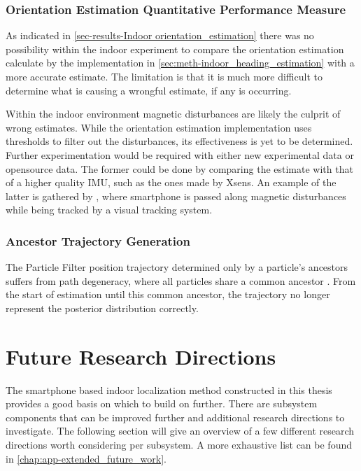 \subsubsection{ Orientation Estimation Quantitative Performance Measure}

As indicated in \cref{sec-results-Indoor orientation_estimation} there was no possibility within the indoor experiment to compare the orientation estimation calculate by the implementation in \cref{sec:meth-indoor_heading_estimation} with a more accurate estimate. The limitation is that it is much more difficult to determine what is causing a wrongful estimate, if any is occurring. \par  

Within the indoor environment magnetic disturbances are likely the culprit of wrong estimates. While the orientation estimation implementation uses thresholds to filter out the disturbances, its effectiveness is yet to be determined. Further experimentation would be required with either new experimental data or opensource data. The former could be done by comparing the estimate with that of a higher quality IMU, such as the ones made by Xsens. An example of the latter is gathered by \citet{Michel2018}, where smartphone is passed along magnetic disturbances while being tracked by a visual tracking system.


\subsubsection{Ancestor Trajectory Generation}
The Particle Filter position trajectory determined  only by a particle's ancestors suffers from path degeneracy, where all particles share a common ancestor \cite{Lindsten2013}. From the start of estimation until this common ancestor, the trajectory no longer represent the posterior distribution correctly. 

\section{Future Research Directions}
The smartphone based indoor localization method constructed in this thesis provides a good basis on which to build on further. There are subsystem components that can be improved further and additional research directions to investigate. The following section will give an overview of a few different research directions worth considering per subsystem. A more exhaustive list can be found in \cref{chap:app-extended_future_work}. 

